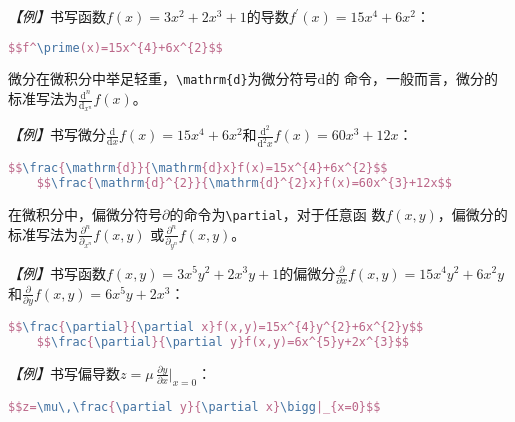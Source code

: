 \emph{【例】}书写函数$f\left(x\right)=3x^{2}+2x^{3}+1$的导数$f^\prime(x)=15x^{4}+6x^{2}$：
\begin{lstlisting}[language=TeX]
    $$f^\prime(x)=15x^{4}+6x^{2}$$
\end{lstlisting}

微分在微积分中举足轻重，\texttt{\textbackslash{}mathrm\{d\}}为微分符号$\mathrm{d}$的
命令，一般而言，微分的标准写法为$\frac{\mathrm{d}^{n}}{\mathrm{d}_{x^{n}}}f\left(x\right)$。

\emph{【例】}书写微分$\frac{\mathrm{d}}{\mathrm{d}x}f(x)=15x^{4}+6x^{2}$和$\frac{\mathrm{d}^{2}}{\mathrm{d}^{2}x}f(x)=60x^{3}+12x$：
\begin{lstlisting}[language=TeX]
    $$\frac{\mathrm{d}}{\mathrm{d}x}f(x)=15x^{4}+6x^{2}$$
    $$\frac{\mathrm{d}^{2}}{\mathrm{d}^{2}x}f(x)=60x^{3}+12x$$
\end{lstlisting}

在微积分中，偏微分符号$\partial$的命令为\texttt{\textbackslash{}partial}，对于任意函
数$f\left(x,y\right)$，偏微分的标准写法为$\frac{\partial^{n}}{\partial_{x^{n}}}f\left(x,y\right)$
或$\frac{\partial^{n}}{\partial_{y^{n}}}f\left(x,y\right)$。

\emph{【例】}书写函数$f\left(x,y\right)=3x^5y^2+2x^3y+1$的偏微分$\frac{\partial}{\partial x}f(x,y)=15x^{4}y^{2}+6x^{2}y$和$\frac{\partial}{\partial y}f(x,y)=6x^{5}y+2x^{3}$：
\begin{lstlisting}[language=TeX]
    $$\frac{\partial}{\partial x}f(x,y)=15x^{4}y^{2}+6x^{2}y$$
    $$\frac{\partial}{\partial y}f(x,y)=6x^{5}y+2x^{3}$$
\end{lstlisting}

\emph{【例】}书写偏导数$z=\mu\,\frac{\partial y}{\partial x}\bigg|_{x=0}$：
\begin{lstlisting}[language=TeX]
    $$z=\mu\,\frac{\partial y}{\partial x}\bigg|_{x=0}$$
\end{lstlisting}